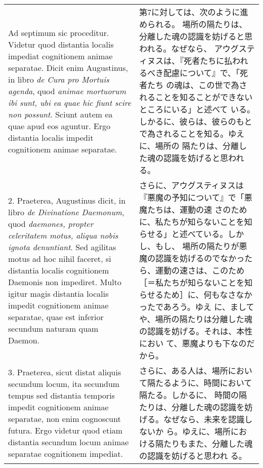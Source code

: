 \documentclass[10pt]{jsarticle} %
\begin{document}
\begin{longtable}{p{21em}p{21em}}

{\huge A}{\sc d septimum sic proceditur}. Videtur quod distantia localis
 impediat cognitionem animae separatae. Dicit enim Augustinus, in libro
 {\it de Cura pro Mortuis agenda}, quod {\it animae mortuorum ibi sunt,
 ubi ea quae hic fiunt scire non possunt}. Sciunt autem ea quae apud eos
 aguntur. Ergo distantia localis impedit cognitionem animae separatae.

&

第7に対しては、次のように進められる。
場所の隔たりは、分離した魂の認識を妨げると思われる。なぜなら、
アウグスティヌスは、『死者たちに払われるべき配慮について』で、「死者たち
 の魂は、この世で為されることを知ることができないところにいる」と述べて
 いる。しかるに、彼らは、彼らのもとで為されることを知る。ゆえに、場所の
 隔たりは、分離した魂の認識を妨げると思われる。

\\



2. {\sc Praeterea}, Augustinus dicit, in libro {\it de Divinatione
 Daemonum}, quod {\it daemones, propter celeritatem motus, aliqua nobis
 ignota denuntiant}. Sed agilitas motus ad hoc nihil faceret, si
 distantia localis cognitionem Daemonis non impediret. Multo igitur
 magis distantia localis impedit cognitionem animae separatae, quae est
 inferior secundum naturam quam Daemon.

&

さらに、アウグスティヌスは『悪魔の予知について』で「悪魔たちは、運動の速
 さのために、私たちが知らないことを知らせる」と述べている。しかし、もし、
 場所の隔たりが悪魔の認識を妨げるのでなかったら、運動の速さは、このため
 ［＝私たちが知らないことを知らせるため］に、何もなさなかったであろう。ゆえ
 に、ましてや、場所の隔たりは分離した魂の認識を妨げる。それは、本性におい
 て、悪魔よりも下なのだから。

\\



3. {\sc Praeterea}, sicut distat aliquis secundum
 locum, ita secundum tempus sed distantia temporis impedit cognitionem
 animae separatae, non enim cognoscunt futura. Ergo videtur quod etiam
 distantia secundum locum animae separatae cognitionem impediat.

&
さらに、ある人は、場所において隔たるように、時間において隔たる。しかるに、
 時間の隔たりは、分離した魂の認識を妨げる。なぜなら、未来を認識しないか
 ら。ゆえに、場所における隔たりもまた、分離した魂の認識を妨げると思われ
 る。


\end{longtable}
\end{document}
